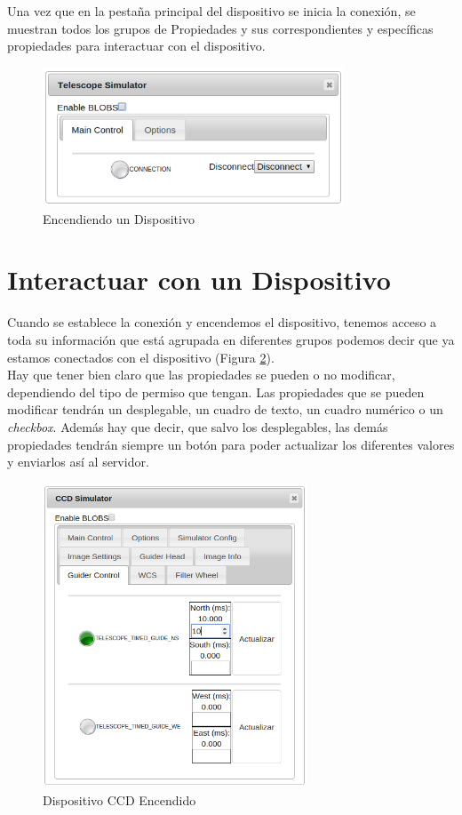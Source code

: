 Una vez que en la pestaña principal del dispositivo se inicia la conexión, se muestran todos los grupos de Propiedades y sus correspondientes y específicas propiedades para interactuar con el dispositivo.
\begin{figure}[htb]
\centering
\includegraphics[width=0.8\textwidth]{./imagenes/capturaEncendiendo}
\caption{Encendiendo un Dispositivo} \label{fig:encendiendoDispositivo}
\end{figure}

\section{Interactuar con un Dispositivo}
Cuando se establece la conexión y encendemos el dispositivo, tenemos acceso a toda su información  que está agrupada en diferentes grupos podemos decir que ya estamos conectados con el dispositivo (Figura \ref{fig:capturaDispositivo}).\\

Hay que tener bien claro que las propiedades se pueden o no modificar, dependiendo del tipo de permiso que tengan. Las propiedades que se pueden modificar tendrán un desplegable, un cuadro de texto, un cuadro numérico o un \textit{checkbox}. Además hay que decir, que salvo los desplegables, las demás propiedades tendrán siempre un botón para poder actualizar los diferentes valores y enviarlos así al servidor.
\begin{figure}[htb]
\centering
\includegraphics[width=0.7\textwidth]{./imagenes/capturaDispositivo}
\caption{Dispositivo CCD Encendido} \label{fig:capturaDispositivo}
\end{figure}

